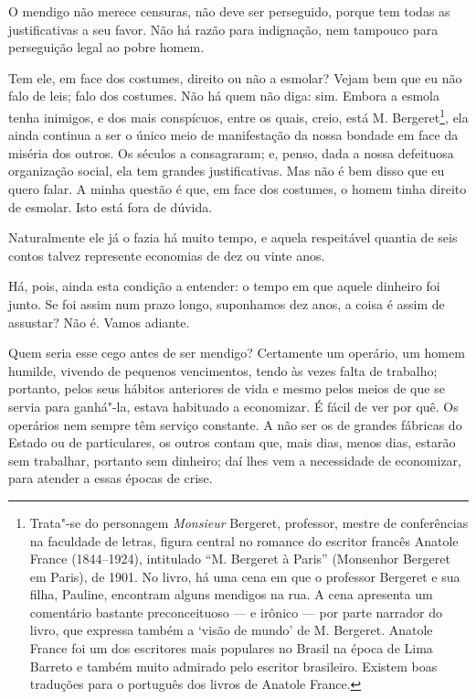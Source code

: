 O mendigo não merece censuras, não deve ser perseguido, porque tem todas
as justificativas a seu favor. Não há razão para indignação, nem
tampouco para perseguição legal ao pobre homem.

Tem ele, em face dos costumes, direito ou não a esmolar? Vejam bem que
eu não falo de leis; falo dos costumes. Não há quem não diga: sim.
Embora a esmola tenha inimigos, e dos mais conspícuos, entre os quais,
creio, está M. Bergeret\footnote{Trata"-se do personagem \emph{Monsieur}
  Bergeret, professor, mestre de conferências na faculdade de letras,
  figura central no romance do escritor francês Anatole France (1844--1924), intitulado ``M. Bergeret à Paris'' (Monsenhor Bergeret em
  Paris), de 1901. No livro, há uma cena em que o professor Bergeret e
  sua filha, Pauline, encontram alguns mendigos na rua. A cena apresenta
  um comentário bastante preconceituoso --- e irônico --- por parte
  narrador do livro, que expressa também a `visão de mundo' de M.
  Bergeret. Anatole France foi um dos escritores mais populares no
  Brasil na época de Lima Barreto e também muito admirado pelo escritor
  brasileiro. Existem boas traduções para o português dos livros de
  Anatole France.}, ela ainda continua a ser o único meio de
manifestação da nossa bondade em face da miséria dos outros. Os séculos
a consagraram; e, penso, dada a nossa defeituosa organização social, ela
tem grandes justificativas. Mas não é bem disso que eu quero falar. A
minha questão é que, em face dos costumes, o homem tinha direito de
esmolar. Isto está fora de dúvida.

Naturalmente ele já o fazia há muito tempo, e aquela respeitável quantia
de seis contos talvez represente economias de dez ou vinte anos.

Há, pois, ainda esta condição a entender: o tempo em que aquele dinheiro
foi junto. Se foi assim num prazo longo, suponhamos dez anos, a coisa é
assim de assustar? Não é. Vamos adiante.

Quem seria esse cego antes de ser mendigo? Certamente um operário, um
homem humilde, vivendo de pequenos vencimentos, tendo às vezes falta de
trabalho; portanto, pelos seus hábitos anteriores de vida e mesmo pelos
meios de que se servia para ganhá"-la, estava habituado a economizar. É
fácil de ver por quê. Os operários nem sempre têm serviço constante. A
não ser os de grandes fábricas do Estado ou de particulares, os outros
contam que, mais dias, menos dias, estarão sem trabalhar, portanto sem
dinheiro; daí lhes vem a necessidade de economizar, para atender a essas
épocas de crise.

